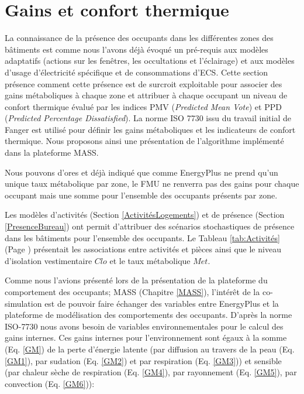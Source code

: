 \section{Gains et confort thermique}

La connaissance de la présence des occupants dans les différentes zones des bâtiments est comme nous l'avons déjà évoqué un pré-requis aux modèles adaptatifs (actions sur les fenêtres, les occultations et l'éclairage) et aux modèles d'usage d'électricité spécifique et de consommations d'ECS. Cette section présence comment cette présence est de surcroit exploitable pour associer des gains métaboliques à chaque zone et attribuer à chaque occupant un niveau de confort thermique évalué par les indices PMV (\textit{Predicted Mean Vote}) et PPD (\textit{Predicted Percentage Dissatisfied}). La norme ISO 7730 \cite{ISO7730} issu du travail initial de Fanger \cite{Fanger-70} est utilisé pour définir les gains métaboliques et les indicateurs de confort thermique. Nous proposons ainsi une présentation de l'algorithme implémenté dans la plateforme MASS.

Nous pouvons d'ores et déjà indiqué que comme EnergyPlus ne prend qu'un unique taux métabolique par zone, le FMU ne renverra pas des gains pour chaque occupant mais une somme pour l'ensemble des occupants présents par zone.

Les modèles d'activités (Section \ref{ActivitésLogements}) et de présence (Section \ref{PresenceBureau}) ont permit d'attribuer des scénarios stochastiques de présence dans les bâtiments pour l'ensemble des occupants. Le Tableau \ref{tab:Activités} (Page \pageref{tab:Activités}) présentait les associations entre activités et pièces ainsi que le niveau d'isolation vestimentaire $Clo$ et le taux métabolique $Met$.

Comme nous l'avions présenté lors de la présentation de la plateforme du comportement des occupants; MASS (Chapitre \ref{MASS}), l'intérêt de la co-simulation est de pouvoir faire échanger des variables entre EnergyPlus et la plateforme de modélisation des comportements des occupants. D'après la norme ISO-7730 \cite{ISO7730} nous avons besoin de variables environnementales pour le calcul des gains internes. Ces gains internes pour l'environnement sont égaux à la somme (Eq. \ref{GM}) de la perte d'énergie latente (par diffusion au travers de la peau (Eq. \ref{GM1}), par sudation (Eq. \ref{GM2}) et par respiration (Eq. \ref{GM3})) et sensible (par chaleur sèche de respiration (Eq. \ref{GM4}), par rayonnement (Eq. \ref{GM5}), par convection (Eq. \ref{GM6})):

